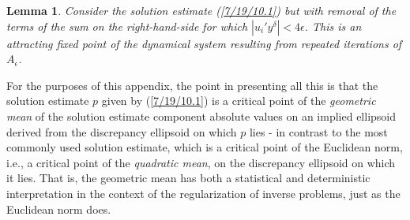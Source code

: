 \documentclass{amsart}
\numberwithin{equation}{section}
\newtheorem{lemma}[theorem]{Lemma}
\theoremstyle{definition}
\numberwithin{theorem}{section}
\begin{document}
\begin{lemma} \label{7/6/21.9} Consider the solution estimate (\ref{7/19/10.1}) but with removal of the terms of the sum on the right-hand-side for which $|u_i'y^\delta|<4\epsilon$.  This is an attracting fixed point of the dynamical system resulting from repeated iterations of $A_\epsilon$. \end{lemma}



For the purposes of this appendix, the point in presenting all this is that the solution estimate $p$ given by (\ref{7/19/10.1}) is a critical point of the {\it geometric mean} of the solution estimate component absolute values on an implied ellipsoid  derived from the discrepancy ellipsoid on which $p$ lies - in contrast to the most commonly used solution estimate, which is a critical point of the Euclidean norm, i.e., a critical point of the {\it quadratic mean}, on the discrepancy ellipsoid on which it lies.  That is, the geometric mean has both a statistical and deterministic interpretation in the context of the regularization of inverse problems, just as the Euclidean norm does. 
 
\end{document}
